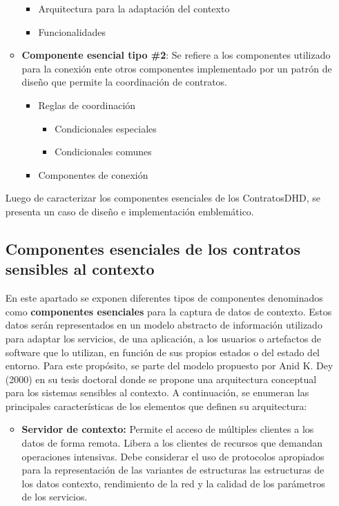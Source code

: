 \begin{itemize}
\begin{itemize}
      \begin{itemize}
       \item Arquitectura para la adaptación del contexto
       \item Funcionalidades 
      \end{itemize}
      
  \item \textbf{Componente esencial tipo \#2}: Se refiere a los componentes utilizado para la conexión ente otros componentes implementado por un patrón de diseño que permite la coordinación de contratos.
	    \begin{itemize}
	    \item Reglas de coordinación
        		  \begin{itemize}
        		   \item Condicionales especiales
        		   \item Condicionales comunes 
        		  \end{itemize}
	    \item Componentes de conexión
	    \end{itemize}
\end{itemize}


Luego de caracterizar los componentes esenciales de los ContratosDHD, se presenta un caso de diseño e implementación emblemático.

\subsection{Componentes esenciales de los contratos sensibles al contexto}

En este apartado se exponen diferentes tipos de componentes denominados como \textbf{componentes esenciales} para la captura de datos de contexto. Estos datos serán representados en un modelo abstracto de información utilizado para adaptar los servicios, de una aplicación, a los usuarios o artefactos de software que lo utilizan, en función de sus propios estados o del estado del entorno. Para este propósito, se parte del modelo propuesto por Anid K. Dey (2000) en su tesis doctoral \cite{Dey} donde se propone una arquitectura conceptual para los sistemas sensibles  al contexto. A continuación, se enumeran las principales características de los elementos que definen su arquitectura:

\begin{itemize}

\item \textbf {Servidor de contexto:} Permite el acceso de múltiples clientes a los datos de forma remota.  Libera a los clientes de recursos que demandan operaciones intensivas.  Debe considerar el uso de protocolos apropiados para la representación de las variantes de estructuras las estructuras de los datos contexto, rendimiento de la red y la calidad de los parámetros de los servicios.


\end{itemize}
\end{itemize}
